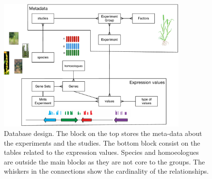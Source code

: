 \begin{figure}
\centering
\includegraphics[width=0.85\textwidth]{expVIP/Figures/dbDesign.pdf}
\caption[expVIP database design]{Database design. The block on the top stores the meta-data about the experiments and the studies. The bottom block consist on the tables related to the expression values. Species and homoeologues are outside the main blocks as they are not core to the groups. The whiskers in the connections show the cardinality of the relationships.  }
\label{fig:expvip:dbDesign}
\end{figure}

